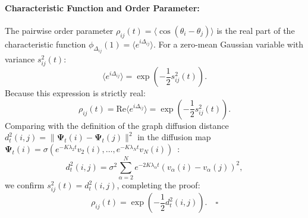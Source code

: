 \paragraph{Characteristic Function and Order Parameter:}
The pairwise order parameter $\rho_{ij}(t) = \langle \cos(\theta_i - \theta_j) \rangle$ is the real part of the characteristic function $\phi_{\Delta_{ij}}(1) = \langle e^{i \Delta_{ij}} \rangle$. For a zero-mean Gaussian variable with variance $s_{ij}^2(t)$:
\begin{equation}
\langle e^{i \Delta_{ij}} \rangle = \exp\left( -\frac{1}{2} s_{ij}^2(t) \right).
\end{equation}
Because this expression is strictly real:
\begin{equation}
\rho_{ij}(t) = \mathrm{Re}\langle e^{i \Delta_{ij}} \rangle = \exp\left( -\frac{1}{2} s_{ij}^2(t) \right).
\end{equation}
Comparing with the definition of the graph diffusion distance $d_t^2(i,j) = \|\mathbf{\Psi}_t(i) - \mathbf{\Psi}_t(j)\|^2$ in the diffusion map $\mathbf{\Psi}_t(i) = \sigma (e^{-K\lambda_2 t} v_2(i), \dots, e^{-K\lambda_N t} v_N(i))$~\cite{coifman2006}:
\begin{equation}
d_t^2(i,j) = \sigma^2 \sum_{\alpha=2}^N e^{-2K\lambda_\alpha t} \left( v_\alpha(i) - v_\alpha(j) \right)^2,
\end{equation}
we confirm $s_{ij}^2(t) = d_t^2(i,j)$, completing the proof:
\begin{equation}
\rho_{ij}(t) = \exp\left( -\frac{1}{2} d_t^2(i,j) \right). \quad \square
\end{equation}

